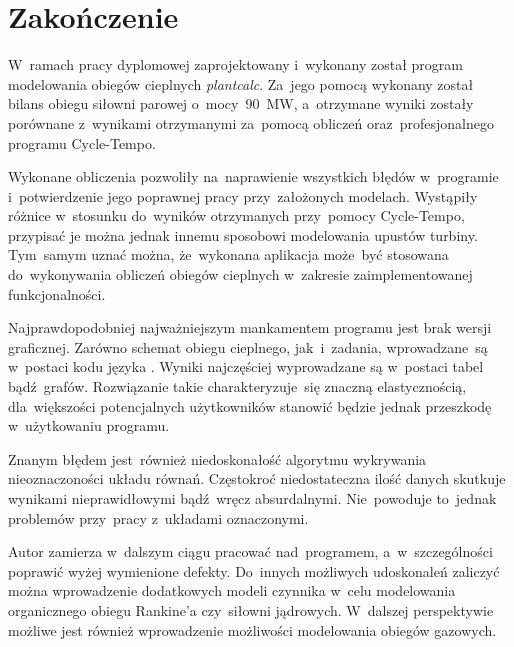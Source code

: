 \section{Zakończenie}

W~ramach pracy dyplomowej zaprojektowany i~wykonany został program
modelowania obiegów cieplnych \textit{plantcalc}. Za~jego pomocą
wykonany został bilans obiegu siłowni parowej
o~mocy~\SI{90}{\mega\watt}, a~otrzymane wyniki zostały porównane
z~wynikami otrzymanymi za~pomocą obliczeń oraz~profesjonalnego programu
Cycle-Tempo.

Wykonane obliczenia pozwoliły na~naprawienie wszystkich błędów
w~programie i~potwierdzenie jego poprawnej pracy przy~założonych
modelach. Wystąpiły różnice w~stosunku do~wyników otrzymanych
przy~pomocy Cycle-Tempo, przypisać je można jednak innemu sposobowi
modelowania upustów turbiny. Tym~samym uznać można, że~wykonana
aplikacja może~być stosowana do~wykonywania obliczeń obiegów cieplnych
w~zakresie zaimplementowanej funkcjonalności.

Najprawdopodobniej najważniejszym mankamentem programu jest brak wersji
graficznej. Zarówno schemat obiegu cieplnego, jak~i~zadania,
wprowadzane~są w~postaci kodu języka \Cpp. Wyniki najczęściej
wyprowadzane są w~postaci tabel bądź~grafów. Rozwiązanie takie
charakteryzuje~się znaczną elastycznością, dla~większości potencjalnych
użytkowników stanowić będzie jednak przeszkodę w~użytkowaniu programu.

Znanym błędem jest~również niedoskonałość algorytmu wykrywania
nieoznaczoności układu równań. Częstokroć niedostateczna ilość danych
skutkuje wynikami nieprawidłowymi bądź~wręcz absurdalnymi. Nie~powoduje
to~jednak problemów przy~pracy z~układami oznaczonymi.

Autor zamierza w~dalszym ciągu pracować nad~programem, a~w~szczególności
poprawić wyżej wymienione defekty. Do~innych możliwych udoskonaleń
zaliczyć można wprowadzenie dodatkowych modeli czynnika w~celu
modelowania organicznego obiegu Rankine'a czy~siłowni jądrowych.
W~dalszej perspektywie możliwe jest również wprowadzenie możliwości
modelowania obiegów gazowych.
